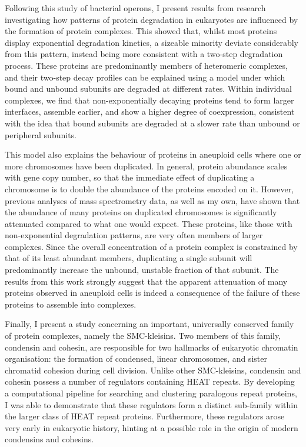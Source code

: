\documentclass[a4paper,11pt,twoside,openright]{scrbook}
\begin{document}
Following this study of bacterial operons, I present results from research investigating how patterns of protein degradation in eukaryotes are influenced by the formation of protein complexes. This showed that, whilst most proteins display exponential degradation kinetics, a sizeable minority deviate considerably from this pattern, instead being more consistent with a two-step degradation process. These proteins are predominantly members of heteromeric complexes, and their two-step decay profiles can be explained using a model under which bound and unbound subunits are degraded at different rates. Within individual complexes, we find that non-exponentially decaying proteins tend to form larger interfaces, assemble earlier, and show a higher degree of coexpression, consistent with the idea that bound subunits are degraded at a slower rate than unbound or peripheral subunits.

This model also explains the behaviour of proteins in aneuploid cells where one or more chromosomes have been duplicated. In general, protein abundance scales with gene copy number, so that the immediate effect of duplicating a chromosome is to double the abundance of the proteins encoded on it. However, previous analyses of mass spectrometry data, as well as my own, have shown that the abundance of many proteins on duplicated chromosomes is significantly attenuated compared to what one would expect. These proteins, like those with non-exponential degradation patterns, are very often members of larger complexes. Since the overall concentration of a protein complex is constrained by that of its least abundant members, duplicating a single subunit will predominantly increase the unbound, unstable fraction of that subunit. The results from this work strongly suggest that the apparent attenuation of many proteins observed in aneuploid cells is indeed a consequence of the failure of these proteins to assemble into complexes.

Finally, I present a study concerning an important, universally conserved family of protein complexes, namely the SMC-kleisins. Two members of this family, condensin and cohesin, are responsible for two hallmarks of eukaryotic chromatin organisation: the formation of condensed, linear chromosomes, and sister chromatid cohesion during cell division. Unlike other SMC-kleisins, condensin and cohesin possess a number of regulators containing HEAT repeats. By developing a computational pipeline for searching and clustering paralogous repeat proteins, I was able to demonstrate that these regulators form a distinct sub-family within the larger class of HEAT repeat proteins. Furthermore, these regulators arose very early in eukaryotic history, hinting at a possible role in the origin of modern condensins and cohesins.
\end{document}
